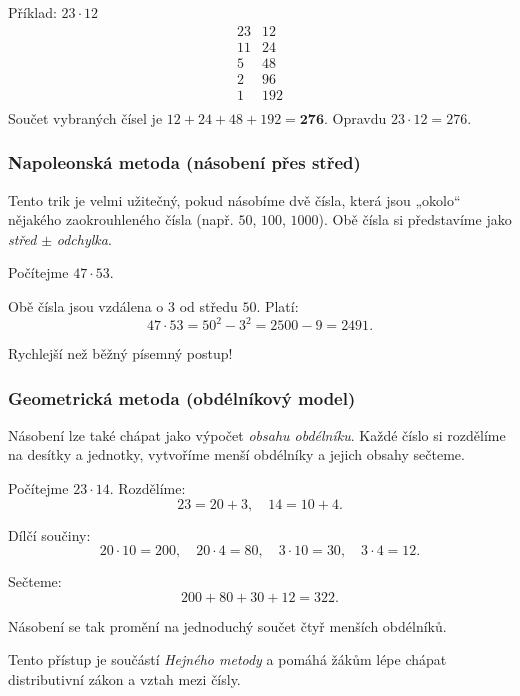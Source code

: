 \documentclass[12pt,a4paper]{article}
\begin{document}
\begin{examplebox}
Příklad: $23\cdot 12$
\[
\begin{array}{r|r}
23 & 12 \\
11 & 24 \\
5 & 48 \\
2 & 96 \\
1 & 192 \\
\end{array}
\]
Součet vybraných čísel je $12+24+48+192 = \mathbf{276}$.  
Opravdu $23\cdot 12 = 276$.
\end{examplebox}


\subsubsection*{Napoleonská metoda (násobení přes střed)}

Tento trik je velmi užitečný, pokud násobíme dvě čísla, která jsou „okolo“ nějakého zaokrouhleného čísla (např. $50$, $100$, $1000$).  
Obě čísla si představíme jako \emph{střed} $\pm$ \emph{odchylka}.  

\begin{examplebox}
Počítejme $47 \cdot 53$.  

Obě čísla jsou vzdálena o $3$ od středu $50$.  
Platí:
\[
47 \cdot 53 = 50^2 - 3^2 = 2500 - 9 = 2491.
\]

Rychlejší než běžný písemný postup!
\end{examplebox}


\subsubsection*{Geometrická metoda (obdélníkový model)}

Násobení lze také chápat jako výpočet \emph{obsahu obdélníku}.  
Každé číslo si rozdělíme na desítky a jednotky, vytvoříme menší obdélníky a jejich obsahy sečteme.  

\begin{examplebox}
Počítejme $23 \cdot 14$.  
Rozdělíme:
\[
23 = 20 + 3, \quad 14 = 10 + 4.
\]

Dílčí součiny:
\[
20 \cdot 10 = 200, \quad 20 \cdot 4 = 80, \quad 3 \cdot 10 = 30, \quad 3 \cdot 4 = 12.
\]

Sečteme:
\[
200 + 80 + 30 + 12 = 322.
\]

Násobení se tak promění na jednoduchý součet čtyř menších obdélníků.
\end{examplebox}

Tento přístup je součástí \emph{Hejného metody} a pomáhá žákům lépe chápat distributivní zákon a vztah mezi čísly.
\end{document}
